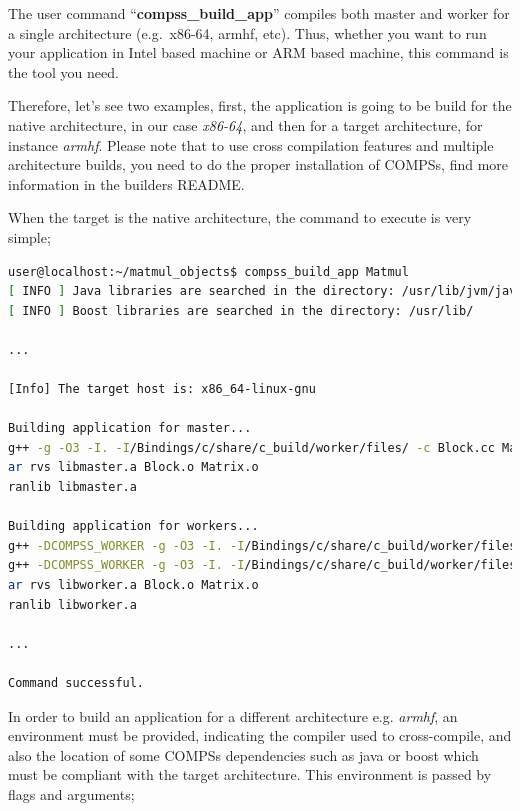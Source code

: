 The user command ``{\bf compss\_build\_app}'' compiles both master and worker for a single architecture (e.g.\ x86-64, armhf, etc). Thus, whether you want to run your application in Intel based machine or ARM based machine, this command is the tool you need.

Therefore, let's see two examples, first, the application is going to be build for the native architecture, in our case {\it x86-64}, and then for a target architecture, for instance {\it armhf}. Please note that to use cross compilation features and multiple architecture builds, you need to do the proper installation of COMPSs, find more information in the builders README.

When the target is the native architecture, the command to execute is very simple;

\begin{lstlisting}[language=bash]
user@localhost:~/matmul_objects$ compss_build_app Matmul
[ INFO ] Java libraries are searched in the directory: /usr/lib/jvm/java-1.8.0-openjdk-amd64//jre/lib/amd64/server
[ INFO ] Boost libraries are searched in the directory: /usr/lib/

...

[Info] The target host is: x86_64-linux-gnu

Building application for master...
g++ -g -O3 -I. -I/Bindings/c/share/c_build/worker/files/ -c Block.cc Matrix.cc 
ar rvs libmaster.a Block.o Matrix.o
ranlib libmaster.a

Building application for workers...
g++ -DCOMPSS_WORKER -g -O3 -I. -I/Bindings/c/share/c_build/worker/files/ -c Block.cc -o Block.o
g++ -DCOMPSS_WORKER -g -O3 -I. -I/Bindings/c/share/c_build/worker/files/ -c Matrix.cc -o Matrix.o
ar rvs libworker.a Block.o Matrix.o 
ranlib libworker.a

... 

Command successful.

\end{lstlisting}

In order to build an application for a different architecture e.g. {\it armhf}, an environment must be provided, indicating the compiler used to cross-compile, and also the location of some COMPSs dependencies such as java or boost which must be compliant with the target architecture. This environment is passed by flags and arguments;

